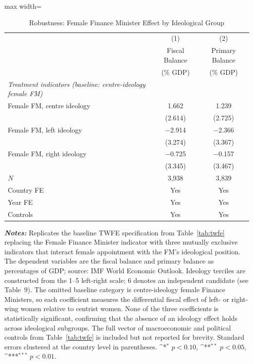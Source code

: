 \begin{table}[htbp]\centering
\def\sym#1{\ifmmode^{#1}\else\(^{#1}\)\fi}
\caption{Robustness: Female Finance Minister Effect by Ideological Group}
\label{tab:robust_ideo}
\begin{adjustbox}{max width=\textwidth}
\small
\begin{tabular}{l*{2}{c}}
\toprule
            &\multicolumn{1}{c}{(1)}
            &\multicolumn{1}{c}{(2)}\\
            &\multicolumn{1}{c}{Fiscal Balance}
            &\multicolumn{1}{c}{Primary Balance}\\
            &\multicolumn{1}{c}{(\% GDP)}
            &\multicolumn{1}{c}{(\% GDP)}\\
\midrule
\textit{Treatment indicators (baseline: centre-ideology female FM)}\\[0.3em]
Female FM, centre ideology
            &  1.662    &  1.239    \\
            & (2.614)   & (2.725)   \\[0.5em]
Female FM, left ideology
            & $-$2.914  & $-$2.366  \\
            & (3.274)   & (3.367)   \\[0.5em]
Female FM, right ideology
            & $-$0.725  & $-$0.157  \\
            & (3.345)   & (3.467)   \\
\midrule
$N$         & 3,938     & 3,839     \\
Country FE  & Yes       & Yes       \\
Year FE     & Yes       & Yes       \\
Controls    & Yes       & Yes       \\
\bottomrule
\end{tabular}
\end{adjustbox}
\begin{minipage}{\textwidth}
\vspace{4pt}
\footnotesize \textit{\textbf{Notes:}} Replicates the baseline TWFE
specification from Table~\ref{tab:twfe} replacing the Female Finance
Minister indicator with three mutually exclusive indicators that
interact female appointment with the FM's ideological position. The
dependent variables are the fiscal balance and primary balance as
percentages of GDP; source: IMF World Economic Outlook. Ideology
terciles are constructed from the 1--5 left-right scale; 6 denotes an
independent candidate (see Table~9). The omitted baseline category is
centre-ideology female Finance Ministers, so each coefficient measures
the differential fiscal effect of left- or right-wing women relative
to centrist women. None of the three coefficients is statistically
significant, confirming that the absence of an ideology effect holds
across ideological subgroups. The full vector of macroeconomic and
political controls from Table~\ref{tab:twfe} is included but not
reported for brevity. Standard errors clustered at the country level
in parentheses. \sym{*} $p<0.10$, \sym{**} $p<0.05$, \sym{***}
$p<0.01$.
\end{minipage}
\end{table}